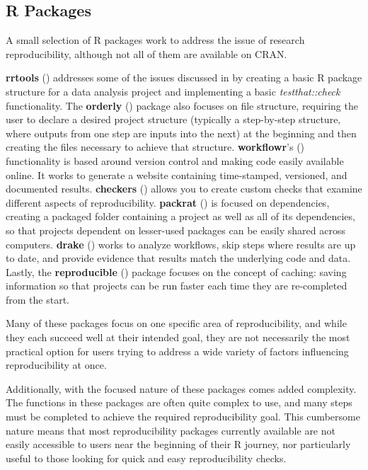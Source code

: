 \documentclass[APA,LATO1COL]{WileyNJD-v2}
\begin{document}
\subsection{R Packages}

A small selection of R packages work to address the issue of research reproducibility, although not all of them are available on CRAN.

\textbf{rrtools} (\cite{R-rrtools}) addresses some of the issues discussed in \cite{marwick2018packaging} by creating a basic R package structure for a data analysis project and implementing a basic \textit{testthat::check} functionality. The \textbf{orderly} (\cite{R-orderly}) package also focuses on file structure, requiring the user to declare a desired project structure (typically a step-by-step structure, where outputs from one step are inputs into the next) at the beginning and then creating the files necessary to achieve that structure. \textbf{workflowr}'s (\cite{R-workflowr}) functionality is based around version control and making code easily available online. It works to generate a website containing time-stamped, versioned, and documented results. \textbf{checkers} (\cite{R-checkers}) allows you to create custom checks that examine different aspects of reproducibility. \textbf{packrat} (\cite{R-packrat}) is focused on dependencies, creating a packaged folder containing a project as well as all of its dependencies, so that projects dependent on lesser-used packages can be easily shared across computers. \textbf{drake} (\cite{R-drake}) works to analyze workflows, skip steps where results are up to date, and provide evidence that results match the underlying code and data. Lastly, the \textbf{reproducible} (\cite{R-reproducible}) package focuses on the concept of caching: saving information so that projects can be run faster each time they are re-completed from the start.

Many of these packages focus on one specific area of reproducibility, and while they each succeed well at their intended goal, they are not necessarily the most practical option for users trying to address a wide variety of factors influencing reproducibility at once.

Additionally, with the focused nature of these packages comes added complexity. The functions in these packages are often quite complex to use, and many steps must be completed to achieve the required reproducibility goal. This cumbersome nature means that most reproducibility packages currently available are not easily accessible to users near the beginning of their R journey, nor particularly useful to those looking for quick and easy reproducibility checks.
\end{document}
